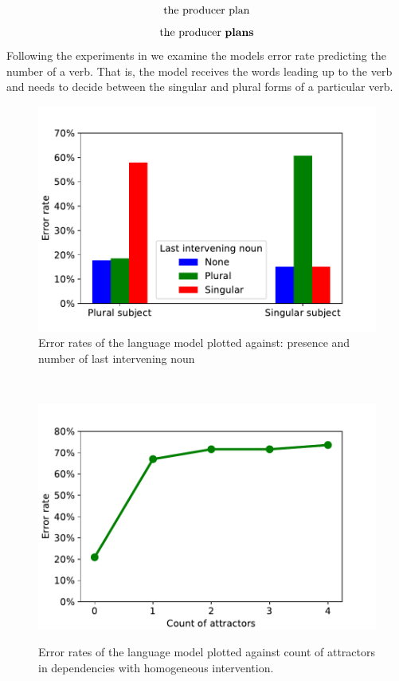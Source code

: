 \documentclass[11pt,a4paper]{article}
\begin{document}
\begin{equation}
	\label{sent:wrong}
	\textnormal{the producer plan}
\end{equation}
\begin{equation}
	\label{sent:right}
	\textnormal{the producer  \textbf{plans}}
\end{equation}
Following the experiments in \citep{Linzen2016} we examine the models error rate predicting the number of a verb. That is, the model receives the words leading up to the verb and needs to decide between the singular and plural forms of a particular verb.

    \begin{figure}
    \centering
        \includegraphics[scale=0.5]{2b.pdf}
            	\caption{Error rates of the language model plotted against: presence and number of last intervening noun}
        \label{fig:2b}
    \end{figure}
    ~ %
    \begin{figure}
    \centering
        \includegraphics[scale=0.5]{2c.pdf}
        \label{fig:2c}
            \caption{Error rates of the language model plotted against count of attractors in dependencies with homogeneous intervention.}
    \end{figure}
\end{document}
